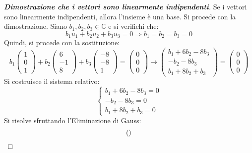 \documentclass[a4paper]{article}
\makeatletter
\newenvironment{rowequmat}[1]{\left(\array{@{}#1@{}}}{\endarray\right)}
\makeatother
\begin{document}
	\begin{proof}[\textbf{Dimostrazione che i vettori sono linearmente indipendenti}]
		Se i vettori sono linearmente indipendenti, allora l'insieme è una base. Si procede con la dimostrazione. Siano $b_{1}, b_{2}, b_{3} \in \mathbb{C}$ e si verifichi che:
		\begin{equation*}
			b_{1}u_{1} + b_{2}u_{2} + b_{3}u_{3} = 0 \Rightarrow b_{1} = b_{2} = b_{3} = 0
		\end{equation*}
		Quindi, si procede con la sostituzione:
		\begin{equation*}
			b_{1}\begin{pmatrix}
				1 \\ 0 \\ 1
			\end{pmatrix} +
			b_{2}\begin{pmatrix}
				6 \\ -1 \\ 8
			\end{pmatrix} +
			b_{3}\begin{pmatrix}
				-8 \\ -8 \\ 1
			\end{pmatrix} =
			\begin{pmatrix}
				0 \\ 0 \\ 0
			\end{pmatrix} \longrightarrow
			\begin{pmatrix}
				b_{1} + 6b_{2} - 8b_{3} \\
				-b_{2} - 8b_{3} \\
				b_{1} + 8b_{2} + b_{3}
			\end{pmatrix} =
			\begin{pmatrix}
				0 \\ 0 \\ 0
			\end{pmatrix}
		\end{equation*}
		Si costruisce il sistema relativo:
		\begin{equation*}
			\begin{cases}
				b_{1} + 6b_{2} - 8b_{3} = 0 \\
				-b_{2} - 8b_{3} = 0 \\
				b_{1} + 8b_{2} + b_{3} = 0
			\end{cases}
		\end{equation*}
		Si risolve sfruttando l'Eliminazione di Gauss:
		\begin{equation*}
			\begin{rowequmat}{ccc|c}

\end{rowequmat}
\end{equation*}
\end{proof}
\end{document}
